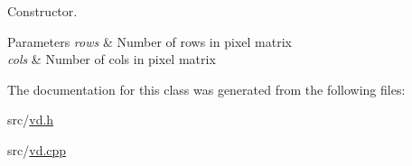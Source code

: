Constructor. 


\begin{DoxyParams}{Parameters}
{\em rows} & Number of rows in pixel matrix \\
\hline
{\em cols} & Number of cols in pixel matrix \\
\hline
\end{DoxyParams}


The documentation for this class was generated from the following files\+:\begin{DoxyCompactItemize}
\item 
src/\mbox{\hyperlink{vd_8h}{vd.\+h}}\item 
src/\mbox{\hyperlink{vd_8cpp}{vd.\+cpp}}\end{DoxyCompactItemize}
